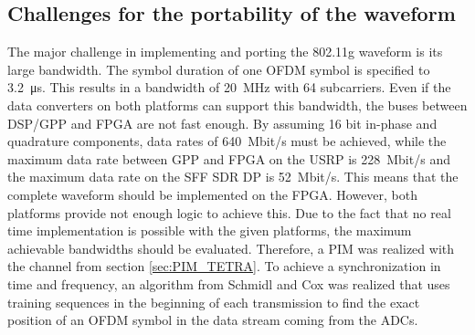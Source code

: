\subsection{Challenges for the portability of the waveform}
The major challenge in implementing and porting the 802.11g waveform is its large bandwidth. The symbol duration of one OFDM symbol is specified to \SI{3.2}{\micro s}. This results in a bandwidth of \SI{20}{MHz} with 64 subcarriers. Even if the data converters on both platforms can support this bandwidth, the buses between DSP/GPP and FPGA are not fast enough. By assuming 16 bit in-phase and quadrature components, data rates of \SI{640}{Mbit/s} must be achieved, while the maximum data rate between GPP and FPGA on the USRP is \SI{228}{Mbit/s} and the maximum data rate on the SFF SDR DP is \SI{52}{Mbit/s}. This means that the complete waveform should be implemented on the FPGA. However, both platforms provide not enough logic to achieve this. Due to the fact that no real time implementation is possible with the given platforms, the maximum achievable bandwidths should be evaluated. Therefore, a \ac{PIM} was realized with the channel from section \ref{sec:PIM_TETRA}. To achieve a synchronization in time and frequency, an algorithm from Schmidl and Cox \cite{schmidl_cox} was realized that uses training sequences in the beginning of each transmission to find the exact position of an OFDM symbol in the data stream coming from the \acp{ADC}. 

